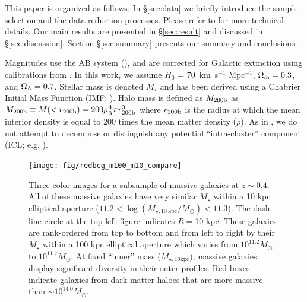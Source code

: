 \documentclass[a4paper,fleqn,usenatbib]{mnras}
\def\redm{\texttt{redMaPPer}}
\def\mstar{{$M_{\star}$}}
\def\minn{{$M_{\star,10\mathrm{kpc}}$}}
\begin{document}
    
    This paper is organized as follows. 
    In \S \ref{sec:data} we briefly introduce the sample selection and the data 
    reduction processes.  
    Please refer to \citet{hscMassiveI} for more technical details.
    Our main results are presented in \S \ref{sec:result} and discussed in 
    \S \ref{sec:discussion}. 
    Section \S \ref{sec:summary} presents our summary and conclusions.

    Magnitudes use the AB system (\citealt{Oke1983}), and are corrected for Galactic 
    extinction using calibrations from \citet{Schlafly11}.
    In this work, we assume $H_0$ = 70~km~s$^{-1}$ Mpc$^{-1}$, ${\Omega}_{\rm m}=0.3$, 
    and ${\Omega}_{\rm \Lambda}=0.7$.
    Stellar mass is denoted \mstar{} and has been derived using a Chabrier Initial Mass 
    Function (IMF; \citealt{Chabrier2003}). Halo mass is defined as $M_{\rm 200b}$ as 
    $M_{\rm 200b}\equiv M(<r_{\rm 200b})=200\bar{\rho} 
    \frac{4}{3}\pi r_{\rm 200b}^3$ where $r_{\rm 200b}$
    is the radius at which the mean interior density is equal to 200 times
    the mean matter density ($\bar{\rho}$). 
    As in \citet{hscMassiveI}, we do not attempt to decompose or distinguish any  
    potential ``intra-cluster'' 
    component (ICL; e.g. \citealt{Carlberg1997, Lin2004, Gonzalez2005, Mihos2005}). 
    

  \begin{figure}
      \centering 
      \texttt{[image: fig/redbcg\_m100\_m10\_compare]}
      \caption{
          Three-color images for a subsample of massive galaxies at $z{\sim}0.4$. 
          All of these massive galaxies have very similar \mstar{} within a 10 kpc 
          elliptical aperture 
          ($11.2<\log (M_{\star,10\ \mathrm{kpc}}/M_{\odot})<11.3$). 
          The dash-line circle at the top-left figure indicates $R=$10 kpc.
          These galaxies are rank-ordered from top to bottom and from left to right 
          by their \mstar{} within a 100 kpc elliptical aperture which varies 
          from $10^{11.2} M_{\odot}$ to $10^{11.7} M_{\odot}$. 
          At fixed ``inner'' mass (\minn{}), massive galaxies display significant
          diversity in their outer profiles. 
          Red boxes indicate galaxies from dark matter haloes that are more massive 
          than ${\sim} 10^{14.0} M_{\odot}$. 
          }
      \label{fig:m100_m10_color}
  \end{figure}
\end{document}
